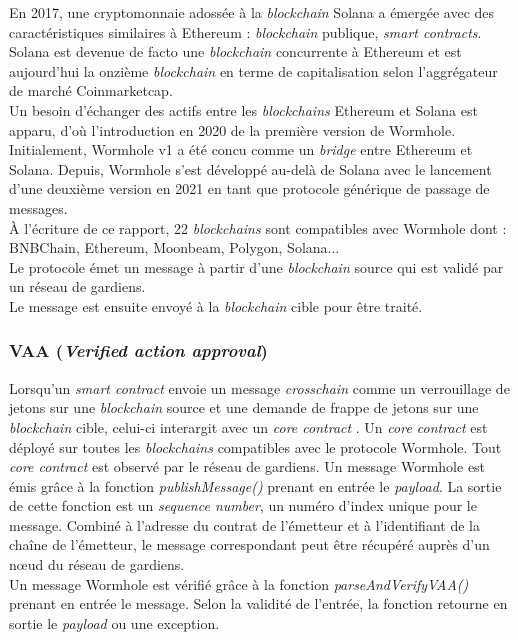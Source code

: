 En 2017, une cryptomonnaie adossée à la \textit{\gls{blockchain}} Solana a émergée avec des caractéristiques
similaires à Ethereum : \textit{\gls{blockchain}} publique, \textit{\gls{smart contract}s}.\\
Solana est devenue de facto une \textit{\gls{blockchain}} concurrente à Ethereum et est aujourd'hui 
la onzième \textit{\gls{blockchain}} en terme de capitalisation selon l'aggrégateur de marché Coinmarketcap.\\
Un besoin d'échanger des \gls{actif}s entre les \textit{\gls{blockchain}s} Ethereum et Solana est apparu, 
d'où l'introduction en 2020 de la première version de Wormhole.
Initialement, Wormhole v1 a été concu comme un \textit{bridge} entre Ethereum et Solana.
Depuis, Wormhole s'est développé au-delà de Solana avec le lancement d'une deuxième version en 2021 
en tant que protocole générique de passage de messages.\\
À l'écriture de ce rapport, 22 \cite{wormholeNetwork} \textit{\gls{blockchain}s} sont compatibles avec Wormhole 
dont : BNBChain, Ethereum, Moonbeam, Polygon, Solana...\\
Le protocole émet un message à partir d'une \textit{\gls{blockchain}} source qui est validé par un réseau de 
gardiens.\\ 
Le message est ensuite envoyé à la \textit{\gls{blockchain}} cible pour être traité.

\subsubsection{VAA (\textit{Verified action approval})}

Lorsqu'un \textit{\gls{smart contract}} envoie un message \textit{crosschain} comme un verrouillage
de jetons sur une \textit{\gls{blockchain}} source et une demande de frappe de jetons sur une 
\textit{\gls{blockchain}} cible, celui-ci interargit avec un \textit{core contract} \cite{wormholeCoreContract}.
Un \textit{core contract} est déployé sur toutes les \textit{\gls{blockchain}s} compatibles avec le protocole 
Wormhole. Tout \textit{core contract} est observé par le réseau de gardiens.
Un message Wormhole est émis grâce à la fonction \textit{publishMessage()} prenant en entrée le \textit{payload}.
La sortie de cette fonction est un \textit{sequence number}, un numéro d'index unique pour le message.
Combiné à l'adresse du contrat de l'émetteur et à l'identifiant de la chaîne de l'émetteur, le message 
correspondant peut être récupéré auprès d'un nœud du réseau de gardiens.\\
Un message Wormhole est vérifié grâce à la fonction \textit{parseAndVerifyVAA()} prenant en entrée le message.
Selon la validité de l'entrée, la fonction retourne en sortie le \textit{payload} ou une exception.


